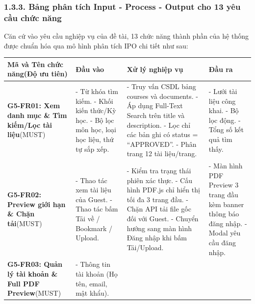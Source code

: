 \subsubsection{1.3.3. Bảng phân tích Input - Process - Output cho 13 yêu cầu chức năng}
Căn cứ vào yêu cầu nghiệp vụ của đề tài, 13 chức năng thành phần của hệ thống được chuẩn hóa qua mô hình phân tích IPO chi tiết như sau:

\begin{table}[H]
\centering
\footnotesize
\renewcommand{\arraystretch}{1.2}
\begin{tabularx}{\textwidth}{|p{3.6cm}|p{3.2cm}|X|p{3.2cm}|}
\hline
\rowcolor[HTML]{EAEAEA}
\textbf{Mã và Tên chức năng\newline(Độ ưu tiên)} & \textbf{Đầu vào} & \textbf{Xử lý nghiệp vụ} & \textbf{Đầu ra} \\
\hline
\textbf{G5-FR01: Xem danh mục \& Tìm kiếm/Lọc tài liệu}\newline(MUST) & 
- Từ khóa tìm kiếm.\newline
- Khối kiến thức/Kỳ học.\newline
- Bộ lọc môn học, loại học liệu, thứ tự sắp xếp. & 
- Truy vấn CSDL bảng courses và documents.\newline
- Áp dụng Full-Text Search trên title và description.\newline
- Lọc chỉ các bản ghi có status = ``APPROVED''.\newline
- Phân trang 12 tài liệu/trang. & 
- Lưới tài liệu công khai.\newline
- Bộ lọc động.\newline
- Tổng số kết quả tìm thấy. \\
\hline
\textbf{G5-FR02: Preview giới hạn \& Chặn tải}\newline(MUST) & 
- Thao tác xem tài liệu của Guest.\newline
- Thao tác bấm Tải về / Bookmark / Upload. & 
- Kiểm tra trạng thái phiên xác thực.\newline
- Cấu hình PDF.js chỉ hiển thị tối đa 3 trang đầu.\newline
- Chặn API tải file gốc đối với Guest.\newline
- Chuyển hướng sang màn hình Đăng nhập khi bấm Tải/Upload. & 
- Màn hình PDF Preview 3 trang đầu kèm banner thông báo đăng nhập.\newline
- Modal yêu cầu đăng nhập. \\
\hline
\textbf{G5-FR03: Quản lý tài khoản \& Full PDF Preview}\newline(MUST) & 
- Thông tin tài khoản (Họ tên, email, mật khẩu).\newline

\end{tabularx}
\end{table}
